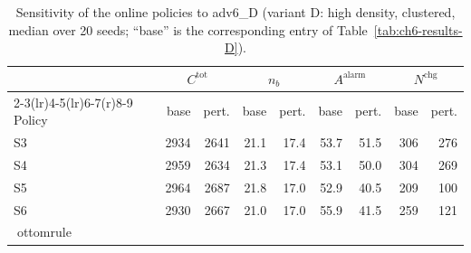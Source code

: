\begin{table}[htbp]
\centering
\caption{Sensitivity of the online policies to adv6_D (variant D: high density, clustered,
median over 20 seeds; ``base'' is the corresponding entry of
Table~\ref{tab:ch6-results-D}).}
\label{tab:ch6-sens-D-adv6}
\footnotesize
\begin{tabular}{@{}l rr rr rr rr@{}}
\toprule
& \multicolumn{2}{c}{$C^{\mathrm{tot}}$} & \multicolumn{2}{c}{$n_b$}
  & \multicolumn{2}{c}{$A^{\mathrm{alarm}}$} & \multicolumn{2}{c}{$N^{\mathrm{chg}}$} \\
\cmidrule(r){2-3}\cmidrule(lr){4-5}\cmidrule(lr){6-7}\cmidrule(r){8-9}
Policy & base & pert. & base & pert. & base & pert. & base & pert. \\
\midrule

S3 & 2934 & 2641 & 21.1 & 17.4 & 53.7 & 51.5 & 306 & 276 \\
S4 & 2959 & 2634 & 21.3 & 17.4 & 53.1 & 50.0 & 304 & 269 \\
S5 & 2964 & 2687 & 21.8 & 17.0 & 52.9 & 40.5 & 209 & 100 \\
S6 & 2930 & 2667 & 21.0 & 17.0 & 55.9 & 41.5 & 259 & 121 \\
ottomrule
\end{tabular}
\end{table}
